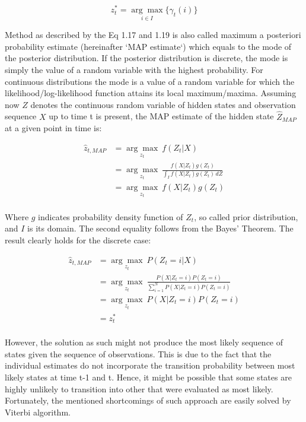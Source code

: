 \begin{equation}
z_t^* = \underset{i \in I}{\arg\max} \{\gamma_t(i)\}
\end{equation}

Method as described by the Eq 1.17 and 1.19 is also called maximum a posteriori probability estimate (hereinafter `MAP estimate`) which equals to the mode of the posterior distribution. If the posterior distribution is discrete, the mode is simply the value of a random variable with the highest probability. For continuous distributions the mode is a value of a random variable for which the likelihood/log-likelihood function attains its local maximum/maxima. Assuming now $Z$ denotes the continuous random variable of hidden states and observation sequence $X$ up to time t is present, the MAP estimate of the hidden state $\hat{Z}_{MAP}$ at a given point in time is:

\begin{align}
\hat{z}_{t,MAP} &= \underset{z_t}{\arg\max} \: f(Z_t|X) \\ \nonumber
&= \underset{z_t}{\arg\max} \: \frac{f(X|Z_t)g(Z_t)}{\int_{I} f(X|Z_t)g(Z_t) \,dZ} \\ \nonumber
&= \underset{z_t}{\arg\max} \: f(X|Z_t)g(Z_t)\\ \nonumber
\end{align}

Where $g$ indicates probability density function of $Z_t$, so called prior distribution, and $I$ is its domain. The second equality follows from the Bayes' Theorem. The result clearly holds for the discrete case:

\begin{align}
\hat{z}_{t,MAP} &= \underset{z_t}{\arg\max} \: P(Z_t=i|X) \\ \nonumber
&= \underset{z_t}{\arg\max} \: \frac{P(X|Z_t=i)P(Z_t=i)}{\sum_{i=1}^N P(X|Z_t=i)P(Z_t=i)} \\ \nonumber
&= \underset{z_t}{\arg\max} \:P(X|Z_t=i)P(Z_t=i)\\ \nonumber
&= z_t^*\\ \nonumber
\end{align}

However, the solution as such might not produce the most likely sequence of states given the sequence of observations. This is due to the fact that the individual estimates do not incorporate the transition probability between most likely states at time t-1 and t. Hence, it might be possible that some states are highly unlikely to transition into other that were evaluated as most likely. Fortunately, the mentioned shortcomings of such approach are easily solved by Viterbi algorithm.

